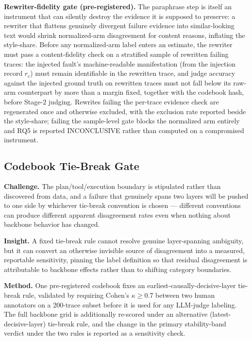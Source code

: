 \documentclass[11pt]{article}
\begin{document}
\textbf{Rewriter-fidelity gate (pre-registered).} The paraphrase step is itself an instrument that can silently destroy the evidence it is supposed to preserve: a rewriter that flattens genuinely divergent failure evidence into similar-looking text would shrink normalized-arm disagreement for content reasons, inflating the style-share. Before any normalized-arm label enters an estimate, the rewriter must pass a content-fidelity check on a stratified sample of rewritten failing traces: the injected fault's machine-readable manifestation (from the injection record $r_c$) must remain identifiable in the rewritten trace, and judge accuracy against the injected ground truth on rewritten traces must not fall below its raw-arm counterpart by more than a margin fixed, together with the codebook hash, before Stage-2 judging. Rewrites failing the per-trace evidence check are regenerated once and otherwise excluded, with the exclusion rate reported beside the style-share; failing the sample-level gate blocks the normalized arm entirely and RQ5 is reported INCONCLUSIVE rather than computed on a compromised instrument.

\subsection{Codebook Tie-Break Gate}
\textbf{Challenge.} The plan/tool/execution boundary is stipulated rather than discovered from data, and a failure that genuinely spans two layers will be pushed to one side by whichever tie-break convention is chosen --- different conventions can produce different apparent disagreement rates even when nothing about backbone behavior has changed.

\textbf{Insight.} A fixed tie-break rule cannot resolve genuine layer-spanning ambiguity, but it can convert an otherwise invisible source of disagreement into a measured, reportable sensitivity, pinning the label definition so that residual disagreement is attributable to backbone effects rather than to shifting category boundaries.

\textbf{Method.} One pre-registered codebook fixes an earliest-causally-decisive-layer tie-break rule, validated by requiring Cohen's $\kappa \geq 0.7$ between two human annotators on a 200-trace subset before it is used for any LLM-judge labeling. The full backbone grid is additionally re-scored under an alternative (latest-decisive-layer) tie-break rule, and the change in the primary stability-band verdict under the two rules is reported as a sensitivity check.
\end{document}
